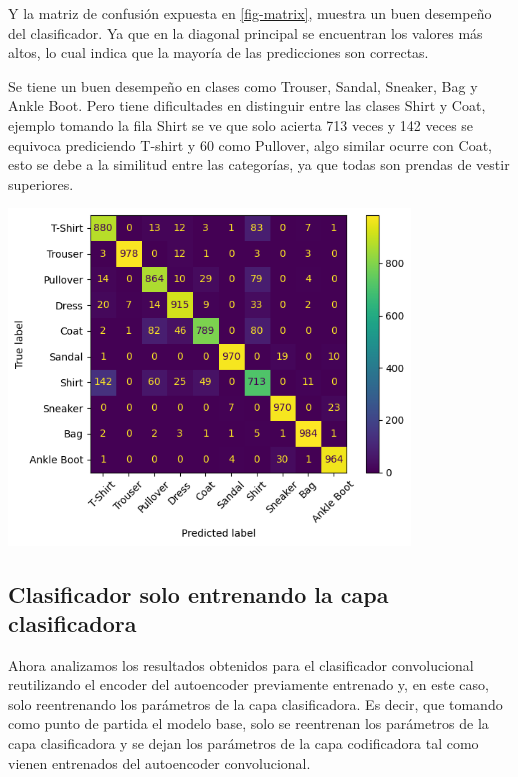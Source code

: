 \documentclass[aps,prl,reprint,groupedaddress]{revtex4-2}
\newenvironment{Figura}
  {\par\medskip\noindent\minipage{\linewidth}}
  {\endminipage\par\medskip}
\begin{document}
Y la matriz de confusión expuesta en \ref{fig-matrix}, muestra un buen desempeño 
del clasificador. Ya que en la diagonal principal se encuentran los valores más altos, 
lo cual indica que la mayoría de las predicciones son correctas.

Se tiene un buen desempeño en clases como Trouser, Sandal, Sneaker, Bag y Ankle
Boot. Pero tiene dificultades en distinguir entre las clases Shirt y Coat, 
ejemplo tomando la fila Shirt se ve que solo acierta 713 veces y 142 veces se 
equivoca prediciendo T-shirt y 60 como Pullover, algo similar ocurre con Coat, 
esto se debe a la similitud entre las categorías, ya que todas son prendas de 
vestir superiores.
\begin{Figura}
  \centering
  \includegraphics[width=0.80\textwidth]{figs1/matrix_confuncion_modelo_con_clasificador.png}
  \label{fig-matrix}
\end{Figura}

\subsection{Clasificador solo entrenando la capa clasificadora}

Ahora analizamos los resultados obtenidos para el clasificador convolucional
reutilizando el encoder del autoencoder previamente entrenado y, en este caso, 
solo reentrenando los parámetros de la capa clasificadora. Es decir, que 
tomando como punto de partida el modelo base, solo se reentrenan los parámetros
de la capa clasificadora y se dejan los parámetros de la capa codificadora tal
como vienen entrenados del autoencoder convolucional.
\end{document}
